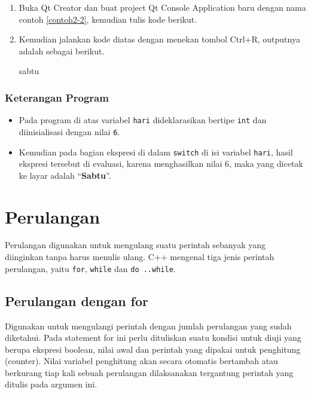 \begin{enumerate}

\item
  Buka Qt Creator dan buat project Qt Console Application baru dengan
  nama contoh \ref{contoh2-2}, kemudian tulis kode berikut.




\item
  Kemudian jalankan kode diatas dengan menekan tombol Ctrl+R, outputnya
  adalah sebagai berikut.

 \begin{lcverbatim}
sabtu
\end{lcverbatim}

\end{enumerate}



\subsubsection*{Keterangan Program}

\begin{itemize}

\item
  Pada program di atas variabel \texttt{hari} dideklarasikan bertipe
  \texttt{int} dan diinisialisasi dengan nilai \texttt{6}.
\item
  Kemudian pada bagian ekspresi di dalam \texttt{switch} di isi variabel
  \texttt{hari}, hasil ekspresi tersebut di evaluasi, karena
  menghasilkan nilai 6, maka yang dicetak ke layar adalah
  ``\textbf{Sabtu}''.
\end{itemize}

\section{Perulangan}\label{perulangan}

Perulangan digunakan untuk mengulang suatu perintah sebanyak yang
diinginkan tanpa harus menulis ulang. C++ mengenal tiga jenis perintah
perulangan, yaitu \texttt{for}, \texttt{while} dan \texttt{do\ ..while}.

\subsection{Perulangan dengan for}\label{perulangan-dengan-for}

Digunakan untuk mengulangi perintah dengan jumlah perulangan yang sudah
diketahui. Pada statement for ini perlu dituliskan suatu kondisi untuk
diuji yang berupa ekspresi boolean, nilai awal dan perintah yang dipakai
untuk penghitung (counter). Nilai variabel penghitung akan secara
otomatis bertambah atau berkurang tiap kali sebuah perulangan
dilaksanakan tergantung perintah yang ditulis pada argumen ini.

